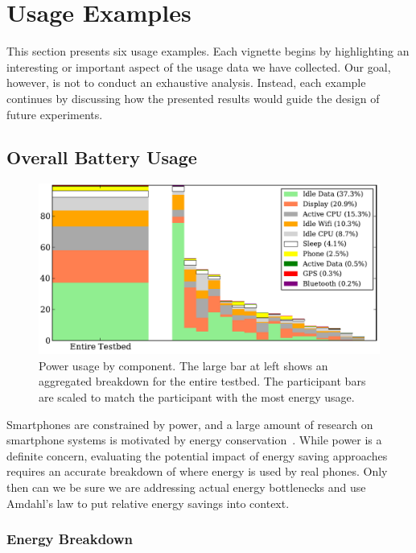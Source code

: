 \section{Usage Examples}
\label{sec-usage}

This section presents six \PhoneLab{} usage examples. Each vignette begins by
highlighting an interesting or important aspect of the usage data we have
collected. Our goal, however, is not to conduct an exhaustive analysis.
Instead, each example continues by discussing how the presented results would
guide the design of future \PhoneLab{} experiments.

\subsection{Overall Battery Usage}
\label{subsec-batteryoverview}

\begin{figure}[t]
\includegraphics[width=\textwidth]{./figures/power/breakdown/graph.pdf}
\caption{Power usage by component. \textnormal{The large bar at left shows an
aggregated breakdown for the entire testbed. The participant bars are scaled
to match the participant with the most energy usage.}}
\label{figure-batteryoverview}
\end{figure}

Smartphones are constrained by power, and a large amount of research on
smartphone systems is motivated by energy
conservation~\cite{FIXME,FIXME,FIXME}. While power is a definite concern,
evaluating the potential impact of energy saving approaches requires an
accurate breakdown of where energy is used by real phones. Only then can we
be sure we are addressing actual energy bottlenecks and use Amdahl's law to
put relative energy savings into context.

\subsubsection{Energy Breakdown}

